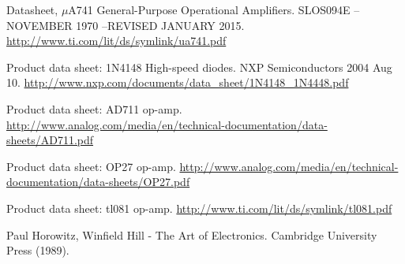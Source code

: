 \documentclass[journal, a4paper]{IEEEtran}
\begin{document}
\begin{thebibliography}{5}

	Datasheet, $\mu $A741 General-Purpose Operational Amplifiers. SLOS094E – NOVEMBER 1970  –REVISED JANUARY 2015.
	\url{http://www.ti.com/lit/ds/symlink/ua741.pdf}

	Product data sheet: 1N4148 High-speed diodes. NXP Semiconductors 2004 Aug 10.
	\url{http://www.nxp.com/documents/data_sheet/1N4148_1N4448.pdf}

	Product data sheet: AD711 op-amp.
	\url{http://www.analog.com/media/en/technical-documentation/data-sheets/AD711.pdf}
	
	Product data sheet: OP27 op-amp.
	\url{http://www.analog.com/media/en/technical-documentation/data-sheets/OP27.pdf}
	
	Product data sheet: tl081 op-amp.
	\url{http://www.ti.com/lit/ds/symlink/tl081.pdf}

	Paul Horowitz, Winfield Hill - The Art of Electronics. Cambridge University Press (1989).
	
\end{thebibliography}

\end{document}
